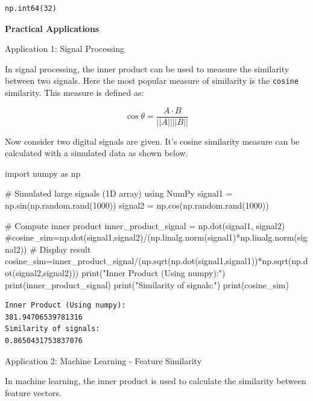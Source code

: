 \documentclass[
  letterpaper,
  DIV=11,
  numbers=noendperiod]{scrreprt}
\newenvironment{Shaded}{\begin{snugshade}}{\end{snugshade}}
\newcommand{\BuiltInTok}[1]{\textcolor[rgb]{0.00,0.23,0.31}{#1}}
\newcommand{\CommentTok}[1]{\textcolor[rgb]{0.37,0.37,0.37}{#1}}
\newcommand{\DecValTok}[1]{\textcolor[rgb]{0.68,0.00,0.00}{#1}}
\newcommand{\ImportTok}[1]{\textcolor[rgb]{0.00,0.46,0.62}{#1}}
\newcommand{\NormalTok}[1]{\textcolor[rgb]{0.00,0.23,0.31}{#1}}
\newcommand{\OperatorTok}[1]{\textcolor[rgb]{0.37,0.37,0.37}{#1}}
\newcommand{\StringTok}[1]{\textcolor[rgb]{0.13,0.47,0.30}{#1}}
\theoremstyle{plain}
\theoremstyle{definition}
\theoremstyle{remark}
\begin{document}
\begin{verbatim}
np.int64(32)
\end{verbatim}

\textbf{Practical Applications}

Application 1: Signal Processing

In signal processing, the inner product can be used to measure the
similarity between two signals. Here the most popular measure of
similarity is the \texttt{cosine} similarity. This measure is defined
as:

\[\cos \theta=\dfrac{A\cdot B}{||A|| ||B||}\]

Now consider two digital signals are given. It's cosine similarity
measure can be calculated with a simulated data as shown below.

\begin{Shaded}
\begin{Highlighting}[]
\ImportTok{import}\NormalTok{ numpy }\ImportTok{as}\NormalTok{ np}

\CommentTok{\# Simulated large signals (1D array) using NumPy}
\NormalTok{signal1 }\OperatorTok{=}\NormalTok{ np.sin(np.random.rand(}\DecValTok{1000}\NormalTok{))}
\NormalTok{signal2 }\OperatorTok{=}\NormalTok{ np.cos(np.random.rand(}\DecValTok{1000}\NormalTok{))}

\CommentTok{\# Compute inner product}
\NormalTok{inner\_product\_signal }\OperatorTok{=}\NormalTok{ np.dot(signal1, signal2)}
\CommentTok{\#cosine\_sim=np.dot(signal1,signal2)/(np.linalg.norm(signal1)*np.linalg.norm(signal2))}
\CommentTok{\# Display result}
\NormalTok{cosine\_sim}\OperatorTok{=}\NormalTok{inner\_product\_signal}\OperatorTok{/}\NormalTok{(np.sqrt(np.dot(signal1,signal1))}\OperatorTok{*}\NormalTok{np.sqrt(np.dot(signal2,signal2)))}
\BuiltInTok{print}\NormalTok{(}\StringTok{"Inner Product (Using numpy):"}\NormalTok{)}
\BuiltInTok{print}\NormalTok{(inner\_product\_signal)}
\BuiltInTok{print}\NormalTok{(}\StringTok{"Similarity of signals:"}\NormalTok{)}
\BuiltInTok{print}\NormalTok{(cosine\_sim)}
\end{Highlighting}
\end{Shaded}

\begin{verbatim}
Inner Product (Using numpy):
381.94706539781316
Similarity of signals:
0.8650431753837076
\end{verbatim}

Application 2: Machine Learning - Feature Similarity

In machine learning, the inner product is used to calculate the
similarity between feature vectors.
\end{document}
